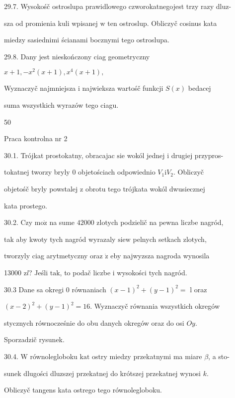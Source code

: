 \documentclass[a4paper,12pt]{article}
\begin{document}
29.7. Wysokośč ostroslupa prawidlowego czworokatnegojest trzy razy dluz-

sza od promienia kuli wpisanej $\mathrm{w}$ ten ostroslup. Obliczyč cosinus kata

miedzy sasiednimi ścianami bocznymi tego ostroslupa.

29.8. Dany jest nieskończony ciag geometryczny

$x+1,-x^{2}(x+1),x^{4}(x+1),$

Wyznaczyč najmniejsza $\mathrm{i}$ najwieksza wartośč funkcji $S(x)$ bedacej

suma wszystkich wyrazów tego ciagu.





50

Praca kontrolna nr 2

30.1. Trójkat prostokatny, obracajac $\mathrm{s}\mathrm{i}\mathrm{e}$ wokól jednej $\mathrm{i}$ drugiej przypros-

tokatnej tworzy bryly $0$ objetościach odpowiednio $V_{1}\mathrm{i}V_{2}$. Obliczyč

objetośč bryly powstalej $\mathrm{z}$ obrotu tego trójkata wokól dwusiecznej

kata prostego.

30.2. Czy $\mathrm{m}\mathrm{o}\dot{\mathrm{z}}$ na sume $42000$ zlotych podzielič na pewna liczbe nagród,

tak aby kwoty tych nagród wyrazaly $\mathrm{s}\mathrm{i}\mathrm{e}\mathrm{w}$ pelnych setkach zlotych,

tworzyly ciag arytmetyczny oraz $\dot{\mathrm{z}}$ eby najwyzsza nagroda wynosila

13000 $\mathrm{z}l$? Jeśli $\mathrm{t}\mathrm{a}\mathrm{k}$, to podač liczbe $\mathrm{i}$ wysokości tych nagród.

30.3 Dane sa okregi $0$ równaniach $(x-1)^{2} + (y-1)^{2} =$ l oraz

$(x-2)^{2}+(y-1)^{2}=16$. Wyznaczyč równania wszystkich okregów

stycznych równocześnie do obu danych okregów oraz do osi $Oy.$

Sporzadzič rysunek.

30.4. $\mathrm{W}$ równolegloboku $\mathrm{k}\mathrm{a}\mathrm{t}$ ostry miedzy przekatnymi ma miare $\beta$, a sto-

sunek dlugości dluzszej przekatnej do krótszej przekatnej wynosi $k.$

Obliczyč tangens kata ostrego tego równolegloboku.
\end{document}
